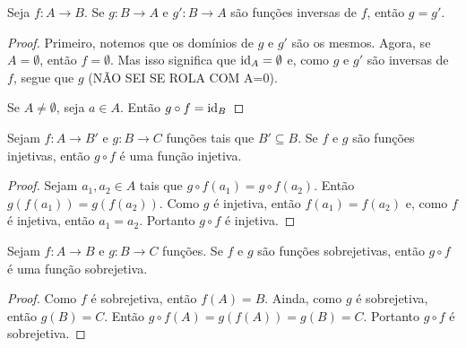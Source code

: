 \begin{prop}
	Seja $f: A \to B$. Se $g: B \to A$ e $g': B \to A$ são funções inversas de $f$, então $g=g'$.
\end{prop}
\begin{proof}
	Primeiro, notemos que os domínios de $g$ e $g'$ são os mesmos. Agora, se $A=\emptyset$, então $f=\emptyset$. Mas isso significa que $\mathrm{id}_A = \emptyset$ e, como $g$ e $g'$ são inversas de $f$, segue que $g$ (NÃO SEI SE ROLA COM A=0).
	
	Se $A \neq \emptyset$, seja $a \in A$. Então $g \circ f = \mathrm{id}_B$
\end{proof}

\begin{prop}
\label{prop:comp.func.inj}
	Sejam $f: A \to B'$ e $g: B \to C$ funções tais que $B' \subseteq B$. Se $f$ e $g$ são funções injetivas, então $g \circ f$ é uma função injetiva.
\end{prop}
\begin{proof}
	Sejam $a_1,a_2 \in A$ tais que $g \circ f(a_1)=g \circ f(a_2)$. Então $g(f(a_1))=g(f(a_2))$. Como $g$ é injetiva, então $f(a_1)=f(a_2)$ e, como $f$ é injetiva, então $a_1=a_2$. Portanto $g \circ f$ é injetiva.
\end{proof}

\begin{prop}
\label{prop:comp.func.sobr}
	Sejam $f: A \to B$ e $g: B \to C$ funções. Se $f$ e $g$ são funções sobrejetivas, então $g \circ f$ é uma função sobrejetiva.
\end{prop}
\begin{proof}
	Como $f$ é sobrejetiva, então $f(A)=B$. Ainda, como $g$ é sobrejetiva, então $g(B)=C$. Então $g \circ f(A) = g(f(A))=g(B)=C$. Portanto $g \circ f$ é sobrejetiva.
\end{proof}

